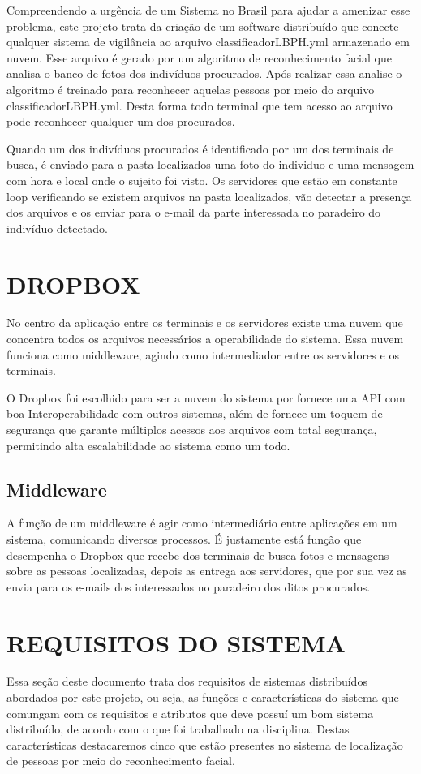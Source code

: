 \documentclass[letterpaper, 10 pt, conference]{ieeeconf}  %
\begin{document}
Compreendendo a urg\^encia de um Sistema no Brasil para ajudar a amenizar esse problema, este projeto trata da cria\c{c}\~ao de um software distribu\'ido que conecte qualquer sistema de vigil\^ancia ao arquivo classificadorLBPH.yml armazenado em nuvem. Esse arquivo \'e gerado por um algoritmo de reconhecimento facial que analisa o banco de fotos dos indiv\'iduos procurados. Ap\'os realizar essa analise o algoritmo \'e treinado para reconhecer aquelas pessoas por meio do arquivo classificadorLBPH.yml. Desta forma todo terminal que tem acesso ao arquivo pode reconhecer qualquer um dos procurados. 

Quando um dos indiv\'iduos procurados \'e identificado por um dos terminais de busca, \'e enviado para a pasta localizados uma foto do individuo e uma mensagem com hora e local onde o sujeito foi visto. Os servidores que est\~ao em constante loop verificando se existem arquivos na pasta localizados, v\~ao detectar a presen\c{c}a dos arquivos e os enviar para o e-mail da parte interessada no paradeiro do indiv\'iduo detectado.

\section{DROPBOX}
No centro da aplica\c{c}\~ao entre os terminais e os servidores existe uma nuvem que concentra todos os arquivos necess\'arios a operabilidade do sistema. Essa nuvem funciona como middleware, agindo como intermediador entre os servidores e os terminais. 

O Dropbox foi escolhido para ser a nuvem do sistema por fornece uma API com boa Interoperabilidade com outros sistemas, al\'em de fornece um toquem de segurança que garante m\'ultiplos acessos aos arquivos com total seguran\c{c}a, permitindo alta escalabilidade ao sistema como um todo.

\subsection{Middleware}
A fun\c{c}\~ao de um  middleware \'e agir como intermedi\'ario entre aplica\c{c}\~oes em um sistema, comunicando diversos processos. \'E justamente est\'a fun\c{c}\~ao que desempenha o Dropbox que recebe dos terminais de busca fotos e mensagens sobre as pessoas localizadas, depois as entrega aos servidores, que por sua vez as envia para os e-mails dos interessados no paradeiro dos ditos procurados.  

\section{REQUISITOS DO SISTEMA}
Essa se\c{c}\~ao deste documento trata dos requisitos de sistemas distribu\'idos abordados por este projeto, ou seja, as fun\c{c}\~oes e caracter\'isticas do sistema que comungam com os requisitos e atributos que deve possu\'i um bom sistema distribu\'ido, de acordo com o que foi trabalhado na disciplina.  Destas caracter\'isticas destacaremos cinco que est\~ao presentes no sistema de localiza\c{c}\~ao de pessoas por meio do reconhecimento facial.    
\end{document}
